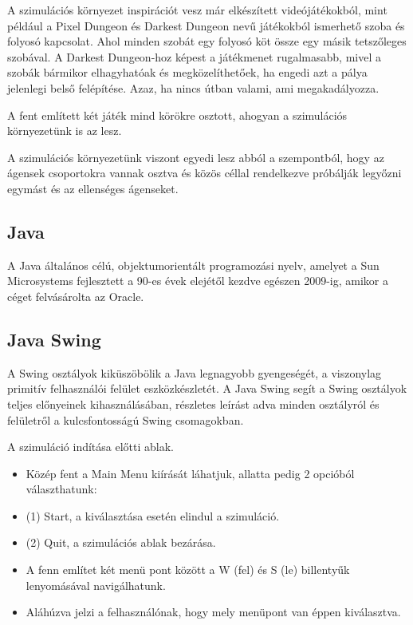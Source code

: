 

A szimulációs környezet inspirációt vesz már elkészített videójátékokból, mint például a Pixel Dungeon \cite{pixeldungeon} és Darkest Dungeon \cite{darkestdungeon} 
nevű játékokból ismerhető szoba és folyosó kapcsolat. Ahol minden szobát egy folyosó köt össze egy másik tetszőleges szobával.
A Darkest Dungeon-hoz képest a játékmenet rugalmasabb, mivel a szobák bármikor elhagyhatóak és megközelíthetőek, ha engedi azt a pálya jelenlegi belső felépítése.
Azaz, ha nincs útban valami, ami megakadályozza.

A fent említett két játék mind körökre osztott, ahogyan a szimulációs környezetünk is az lesz.

A szimulációs környezetünk viszont egyedi lesz abból a szempontból, hogy az ágensek csoportokra vannak osztva és közös céllal
rendelkezve próbálják legyőzni egymást és az ellenséges ágenseket.


\subsection{Java}

A Java általános célú, objektumorientált programozási nyelv, amelyet a Sun Microsystems fejlesztett a 90-es évek elejétől kezdve egészen 2009-ig, amikor a céget felvásárolta az Oracle.

\subsection{Java Swing}

A Swing osztályok kiküszöbölik a Java legnagyobb gyengeségét, a viszonylag primitív felhasználói felület eszközkészletét. A Java Swing segít a Swing osztályok teljes előnyeinek kihasználásában,
részletes leírást adva minden osztályról és felületről a kulcsfontosságú Swing csomagokban.


A szimuláció indítása előtti ablak.

\begin{itemize}
    \item Közép fent a Main Menu kiírását láhatjuk, allatta pedig 2 opcióból választhatunk:
    \item (1) Start, a kiválasztása esetén elindul a szimuláció.
    \item (2) Quit, a szimulációs ablak bezárása.
    \item A fenn említet két menü pont között a W (fel) és S (le) billentyűk lenyomásával navigálhatunk.
    \item Aláhúzva jelzi a felhasználónak, hogy mely menüpont van éppen kiválasztva.
\end{itemize}

